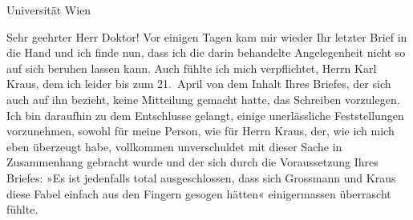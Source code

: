 \pstart
           Universität Wien\pend
           
\pstart{}Sehr geehrter Herr Doktor!\pend\vspace{0.5em}
\pstart
           Vor einigen Tagen kam mir wieder Ihr letzter Brief in die Hand und ich finde nun,
               dass ich die darin behandelte Angelegenheit nicht so auf sich beruhen lassen kann.
               Auch fühlte ich mich verpflichtet, Herrn Karl
                  Kraus, dem ich leider bis zum 21. April von dem Inhalt Ihres
               Briefes, der sich auch auf ihn bezieht, keine Mitteilung gemacht hatte, das Schreiben
               vorzulegen. Ich bin daraufhin zu dem Entschlusse gelangt, einige unerlässliche
               Feststellungen vorzunehmen, sowohl für meine Person, wie für Herrn Kraus, der, wie ich mich eben überzeugt habe,
               vollkommen unverschuldet mit dieser Sache in Zusammenhang gebracht wurde und der sich
               durch die Voraussetzung Ihres Briefes: »Es ist jedenfalls total ausgeschlossen, dass
               sich Grossmann und Kraus diese Fabel einfach aus den Fingern gesogen hätten«
               einigermassen überrascht fühlte.\pend
           
